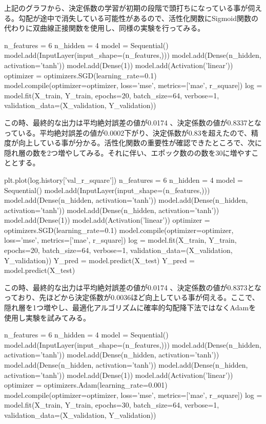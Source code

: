 \documentclass{article}
\begin{document}
上記のグラフから、決定係数の学習が初期の段階で頭打ちになっている事が伺える。勾配が途中で消失している可能性があるので、活性化関数にSigmoid関数の代わりに双曲線正接関数を使用し、同様の実験を行ってみる。
\\

\begin{python}
n_features = 6
n_hidden   = 4
model = Sequential()
model.add(InputLayer(input_shape=(n_features,)))
model.add(Dense(n_hidden, activation='tanh'))
model.add(Dense(1))
model.add(Activation('linear'))
optimizer = optimizers.SGD(learning_rate=0.1)
model.compile(optimizer=optimizer,
              loss='mse', metrics=['mae', r_square])
log = model.fit(X_train, Y_train, epochs=20, batch_size=64, 
verbose=1,
         validation_data=(X_validation, Y_validation))
\end{python}

この時、最終的な出力は平均絶対誤差の値が0.0174 、決定係数の値が0.8337となっている。平均絶対誤差の値が0.0002下がり、決定係数が0.83を超えたので、精度が向上している事が分かる。活性化関数の重要性が確認できたところで、次に隠れ層の数を2つ増やしてみる。それに伴い、エポック数のの数を30に増やすこととする。
\\


\begin{python}
plt.plot(log.history['val_r_square'])
n_features = 6
n_hidden   = 4
model = Sequential()
model.add(InputLayer(input_shape=(n_features,)))
model.add(Dense(n_hidden, activation='tanh'))
model.add(Dense(n_hidden, activation='tanh'))
model.add(Dense(n_hidden, activation='tanh'))
model.add(Dense(1))
model.add(Activation('linear'))
optimizer = optimizers.SGD(learning_rate=0.1)
model.compile(optimizer=optimizer,
              loss='mse', metrics=['mae', r_square])
log = model.fit(X_train, Y_train, epochs=20, batch_size=64, 
verbose=1,
         validation_data=(X_validation, Y_validation))
Y_pred = model.predict(X_test)
Y_pred = model.predict(X_test)
\end{python}


この時、最終的な出力は平均絶対誤差の値が0.0174 、決定係数の値が0.8373となっており、先ほどから決定係数が0.0036ほど向上している事が伺える。ここで、隠れ層を1つ増やし、最適化アルゴリズムに確率的勾配降下法ではなくAdamを使用し実験を試みてみる。
\\


\begin{python}
n_features = 6
n_hidden   = 4
model = Sequential()
model.add(InputLayer(input_shape=(n_features,)))
model.add(Dense(n_hidden, activation='tanh'))
model.add(Dense(n_hidden, activation='tanh'))
model.add(Dense(n_hidden, activation='tanh'))
model.add(Dense(n_hidden, activation='tanh'))
model.add(Dense(1))
model.add(Activation('linear'))
optimizer = optimizers.Adam(learning_rate=0.001)
model.compile(optimizer=optimizer,
              loss='mse', metrics=['mae', r_square])
log = model.fit(X_train, Y_train, epochs=30, batch_size=64, 
verbose=1,
         validation_data=(X_validation, Y_validation))
\end{python}
\end{document}
